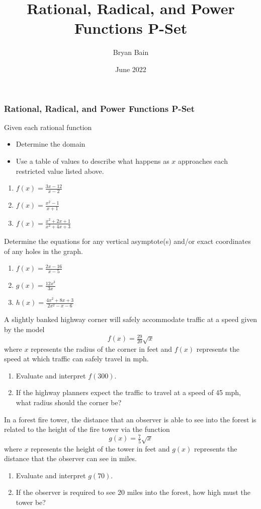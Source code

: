 \documentclass{article}
\title{Rational, Radical, and Power Functions P-Set}
\author{Bryan Bain}
\date{June 2022}
\newcounter{pset}
\begin{document}
\subsubsection*{Rational, Radical, and Power Functions P-Set}

Given each rational function
\begin{itemize}
    \item Determine the domain
    \item Use a table of values to describe what happens as $x$ approaches each restricted value listed above.
\end{itemize}
\begin{multicols}{3}
\begin{enumerate}
    \item $f(x) = \frac{3x-12}{x-2}$
    \item $f(x) = \frac{x^2-1}{x+1}$
    \item $f(x) = \frac{x^2+2x+1}{x^2+4x+3}$
\end{enumerate} \setcounter{pset}{\value{enumi}}
\end{multicols}

Determine the equations for any vertical asymptote(s) and/or exact coordinates of any holes in the graph.
\begin{multicols}{3}
\begin{enumerate}   \setcounter{enumi}{\value{pset}}
    \item $f(x) = \frac{2x-16}{x-5}$
    \item $g(x) = \frac{12x^3}{3x}$
    \item $h(x) = \frac{4x^2+8x+3}{2x^2-x-6}$
\end{enumerate}     \setcounter{pset}{\value{enumi}}
\end{multicols}


A slightly banked highway corner will safely accommodate traffic at a speed given by the model
    \[
    f(x) = \tfrac{29}{20}\sqrt{x}
    \]
where $x$ represents the radius of the corner in feet and $f(x)$ represents the speed at which traffic can safely travel in mph.
\begin{enumerate}   \setcounter{enumi}{\value{pset}}
    \item Evaluate and interpret $f(300)$.
    \item If the highway planners expect the traffic to travel at a speed of 45 mph, what radius should the corner be?
\end{enumerate} \setcounter{pset}{\value{enumi}}

In a forest fire tower, the distance that an observer is able to see into the forest is related to the height of the fire tower via the function
\[
g(x) = \tfrac{7}{5}\sqrt{x}
\]
where $x$ represents the height of the tower in feet and $g(x)$ represents the distance that the observer can see in miles.
\begin{enumerate}   \setcounter{enumi}{\value{pset}}
    \item Evaluate and interpret $g(70)$.
    \item If the observer is required to see 20 miles into the forest, how high must the tower be?
\end{enumerate} \setcounter{pset}{\value{enumi}}
\end{document}
